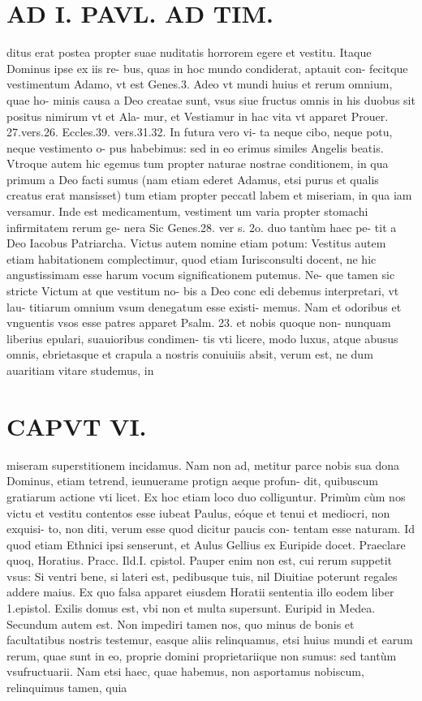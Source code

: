 \documentclass{article}
\begin{document}
\begin{pages}
\section*{AD I. PAVL. AD TIM. }
\marginpar{[ p.130 ]}\pstart ditus erat postea propter suae nuditatis horrorem egere et vestitu. Itaque Dominus ipse ex iis re- bus, quas in hoc mundo condiderat, aptauit con- fecitque vestimentum Adamo, vt est Genes.3. Adeo vt mundi huius et rerum omnium, quae ho- minis causa a Deo creatae sunt, vsus siue fructus omnis in his duobus sit positus nimirum vt et Ala- mur, et Vestiamur in hac vita vt apparet Prouer. 27.vers.26. Eccles.39. vers.31.32. In futura vero vi- ta neque cibo, neque potu, neque vestimento o- pus habebimus: sed in eo erimus similes Angelis beatis. Vtroque autem hic egemus tum propter naturae nostrae conditionem, in qua primum a Deo facti sumus (nam etiam ederet Adamus, etsi purus et qualis creatus erat mansisset) tum etiam propter peccatl labem et miseriam, in qua iam versamur. Inde est medicamentum, vestiment um varia propter stomachi infirmitatem rerum ge- nera Sic Genes.28. ver s. 2o. duo tantùm haec pe- tit a Deo Iacobus Patriarcha.  \pend\pstart Victus autem nomine etiam potum: Vestitus autem etiam habitationem complectimur, quod etiam Iurisconsulti docent, ne hic angustissimam esse harum vocum significationem putemus. Ne- que tamen sic stricte Victum at que vestitum no- bis a Deo conc edi debemus interpretari, vt lau- titiarum omnium vsum denegatum esse existi- memus. Nam et odoribus et vnguentis vsos esse patres apparet Psalm. 23. et nobis quoque non- nunquam liberius epulari, suauioribus condimen- tis vti licere, modo luxus, atque abusus omnis, ebrietasque et crapula a nostris conuiuiis absit, verum est, ne dum auaritiam vitare studemus, in  \pend
\section*{CAPVT VI. }
\marginpar{[ p.439 ]}\pstart miseram superstitionem incidamus. Nam non ad, metitur parce nobis sua dona Dominus, etiam tetrend, ieunuerame protign aeque profun- dit, quibuscum gratiarum actione vti licet.  \pend\pstart Ex hoc etiam loco duo colliguntur. Primùm cùm nos victu et vestitu contentos esse iubeat Paulus, eóque et tenui et mediocri, non exquisi- to, non diti, verum esse quod dicitur paucis con- tentam esse naturam. Id quod etiam Ethnici ipsi senserunt, et Aulus Gellius ex Euripide docet. Praeclare quoq, Horatius. Pracc. Ild.I. cpistol. Pauper enim non est, cui rerum suppetit vsus: Si ventri bene, si lateri est, pedibusque tuis, nil Diuitiae poterunt regales addere maius.  \pend\pstart Ex quo falsa apparet eiusdem Horatii sententia illo eodem liber 1.epistol.  \pend\pstart Exilis domus est, vbi non et multa supersunt. Euripid in Medea.  \pend\pstart Secundum autem est. Non impediri tamen nos, quo minus de bonis et facultatibus nostris testemur, easque aliis relinquamus, etsi huius mundi et earum rerum, quae sunt in eo, proprie domini proprietariique non sumus: sed tantùm vsufructuarii. Nam etsi haec, quae habemus, non asportamus nobiscum, relinquimus tamen, quia  \pend

\end{pages}
\end{document}
